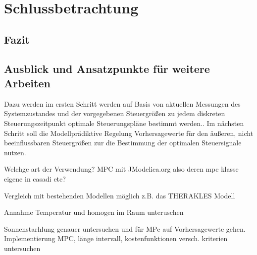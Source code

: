 %
%

\renewcommand{\chapterheadstartvskip}{\vspace*{3cm}}

\chapter{Schlussbetrachtung}
\label{chap:schlussteil}
\renewcommand{\chapterheadstartvskip}{\vspace*{-0.5cm}}

\section{Fazit}
\label{sec:zusammenfassung}



\section{Ausblick und Ansatzpunkte für weitere Arbeiten}
\label{sec:ausblick}

Dazu werden im ersten Schritt werden auf Basis von aktuellen Messungen des Systemzustandes und der vorgegebenen Steuergrößen zu jedem diskreten Steuerungszeitpunkt optimale Steuerungspläne bestimmt werden..
Im nächsten Schritt soll die Modellprädiktive Regelung Vorhersagewerte für den äußeren, nicht beeinflussbaren Steuergrößen zur die Bestimmung der optimalen Steuersignale nutzen.

Welchge art der Verwendung?
MPC mit JModelica.org also deren mpc klasse
eigene in casadi
etc?

Vergleich mit bestehenden Modellen möglich z.B. das THERAKLES Modell

Annahme Temperatur und homogen im Raum unteruschen

Sonnenstarhlung genauer untersuchen und für MPc auf Vorhersagewerte gehen.
Implementierung MPC, länge intervall, kostenfunktionen versch. kriterien untersuchen